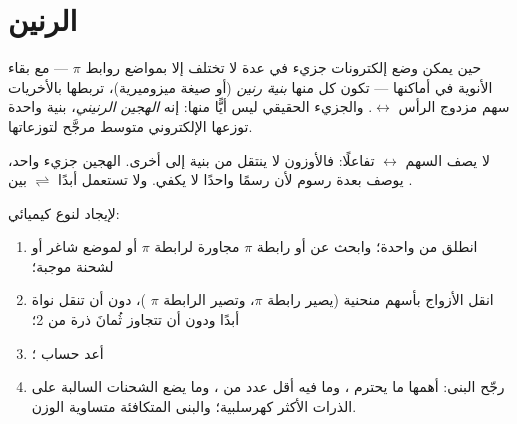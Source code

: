 \section{الرنين}

\begin{definition}\label{def:b1:lewis-resonance-vsepr:resonance}
حين يمكن وضع إلكترونات جزيء في عدة 
لا تختلف إلا بمواضع روابط $\pi$  --- مع بقاء الأنوية في أماكنها --- تكون كل منها \emph{بنية
رنين} (أو صيغة ميزوميرية)، تربطها بالأخريات
سهم مزدوج الرأس $\leftrightarrow$. والجزيء الحقيقي
ليس أيًّا منها: إنه \emph{الهجين الرنيني}،
بنية واحدة توزعها الإلكتروني متوسط مرجَّح
لتوزعاتها.
\end{definition}

\begin{remark}\label{rem:b1:lewis-resonance-vsepr:arrow}
لا يصف السهم $\leftrightarrow$ تفاعلًا: فالأوزون لا ينتقل
من بنية إلى أخرى. الهجين جزيء واحد،
يوصف بعدة رسوم لأن رسمًا واحدًا لا يكفي. ولا
تستعمل أبدًا $\rightleftharpoons$ بين .
\end{remark}

\begin{method}\label{met:b1:lewis-resonance-vsepr:resonance}
لإيجاد  لنوع كيميائي:
\begin{enumerate}
  \item انطلق من  واحدة؛ وابحث عن  أو
        رابطة $\pi$ مجاورة لرابطة $\pi$ أو لموضع شاغر أو لشحنة
        موجبة؛
  \item انقل الأزواج بأسهم منحنية (يصير  رابطة $\pi$، وتصير
        الرابطة $\pi$ )، دون أن تنقل نواة أبدًا ودون أن
        تتجاوز ثُمانَ ذرة من  2؛
  \item أعد حساب ؛
  \item رجّح البنى: أهمها ما يحترم ، وما فيه أقل عدد من ، وما يضع الشحنات السالبة على
        الذرات الأكثر كهرسلبية؛ والبنى المتكافئة متساوية
        الوزن.
\end{enumerate}
\end{method}


